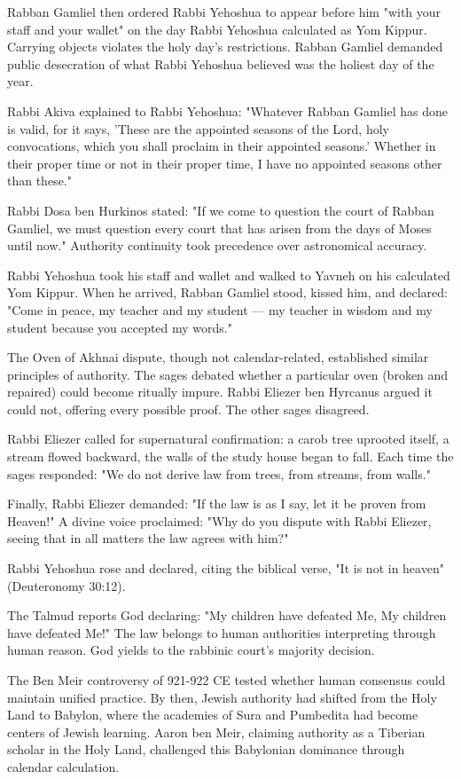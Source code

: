 Rabban Gamliel then ordered Rabbi Yehoshua to appear before him "with your staff and your wallet" on the day Rabbi Yehoshua calculated as Yom Kippur. Carrying objects violates the holy day's restrictions. Rabban Gamliel demanded public desecration of what Rabbi Yehoshua believed was the holiest day of the year.

Rabbi Akiva explained to Rabbi Yehoshua: "Whatever Rabban Gamliel has done is valid, for it says, 'These are the appointed seasons of the Lord, holy convocations, which you shall proclaim in their appointed seasons.' Whether in their proper time or not in their proper time, I have no appointed seasons other than these."

Rabbi Dosa ben Hurkinos stated: "If we come to question the court of Rabban Gamliel, we must question every court that has arisen from the days of Moses until now." Authority continuity took precedence over astronomical accuracy.

Rabbi Yehoshua took his staff and wallet and walked to Yavneh on his calculated Yom Kippur. When he arrived, Rabban Gamliel stood, kissed him, and declared: "Come in peace, my teacher and my student — my teacher in wisdom and my student because you accepted my words."

The Oven of Akhnai dispute, though not calendar-related, established similar principles of authority. The sages debated whether a particular oven (broken and repaired) could become ritually impure. Rabbi Eliezer ben Hyrcanus argued it could not, offering every possible proof. The other sages disagreed.

Rabbi Eliezer called for supernatural confirmation: a carob tree uprooted itself, a stream flowed backward, the walls of the study house began to fall. Each time the sages responded: "We do not derive law from trees, from streams, from walls."

Finally, Rabbi Eliezer demanded: "If the law is as I say, let it be proven from Heaven!" A divine voice proclaimed: "Why do you dispute with Rabbi Eliezer, seeing that in all matters the law agrees with him?"

Rabbi Yehoshua rose and declared, citing the biblical verse, "It is not in heaven" (Deuteronomy 30:12).

The Talmud reports God declaring: "My children have defeated Me, My children have defeated Me!" The law belongs to human authorities interpreting through human reason. God yields to the rabbinic court's majority decision.

The Ben Meir controversy of 921-922 CE tested whether human consensus could maintain unified practice. By then, Jewish authority had shifted from the Holy Land to Babylon, where the academies of Sura and Pumbedita had become centers of Jewish learning. Aaron ben Meir, claiming authority as a Tiberian scholar in the Holy Land, challenged this Babylonian dominance through calendar calculation.

